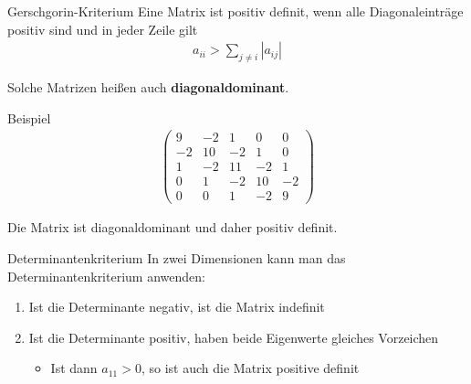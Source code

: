 \begin{frame}{Gerschgorin-Kriterium}
  Eine Matrix ist positiv definit, wenn alle Diagonaleinträge positiv
  sind und in jeder Zeile gilt
  \begin{gather*}
    a_{ii} > \sum_{j\neq i} \left|a_{ij}\right|
  \end{gather*}

  Solche Matrizen heißen auch \textbf{diagonaldominant}.
\end{frame}

\begin{frame}{Beispiel}
  \begin{gather*}
    \begin{pmatrix}
      9 & -2 & 1 & 0 & 0 \\
      -2 & 10 & -2 & 1 & 0 \\
      1 & -2 & 11 & -2 & 1 \\
      0 & 1 & -2 & 10 & -2 \\
      0 & 0 & 1 & -2 & 9
    \end{pmatrix}
  \end{gather*}

  Die Matrix ist diagonaldominant und daher positiv definit.
\end{frame}

\begin{frame}{Determinantenkriterium}
  In zwei Dimensionen kann man das Determinantenkriterium anwenden:
  \begin{enumerate}
  \item Ist die Determinante negativ, ist die Matrix indefinit
  \item Ist die Determinante positiv, haben beide Eigenwerte gleiches Vorzeichen
    \begin{itemize}
    \item Ist dann \(a_{11}>0\), so ist auch die Matrix positive definit
    \end{itemize}
  \end{enumerate}
\end{frame}

